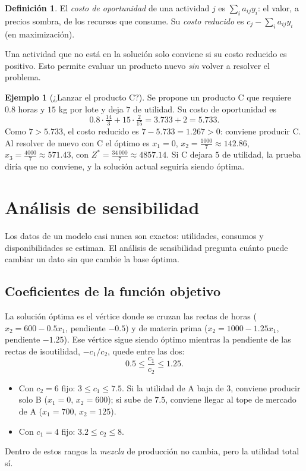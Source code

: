 \documentclass[a4paper,11pt]{article}
\theoremstyle{plain}
\theoremstyle{definition}
\newtheorem{definicion}[teorema]{Definición}
\newtheorem{ejemplo}[teorema]{Ejemplo}
\newcommand{\fr}[2]{\tfrac{#1}{#2}}
\begin{document}
\begin{definicion}
El \emph{costo de oportunidad} de una actividad $j$ es $\sum_i a_{ij}y_i$: el valor, a precios sombra, de los
recursos que consume. Su \emph{costo reducido} es $c_j-\sum_i a_{ij}y_i$ (en maximización).
\end{definicion}

Una actividad que no está en la solución solo conviene si su costo reducido es positivo. Esto permite
evaluar un producto nuevo \emph{sin} volver a resolver el problema.

\begin{ejemplo}[¿Lanzar el producto C?]
Se propone un producto C que requiere $0.8$ horas y $15$ kg por lote y deja $7$ de utilidad. Su costo de
oportunidad es
\[
0.8\cdot\fr{14}{3}+15\cdot\fr{2}{15}=3.733+2=5.733.
\]
Como $7>5.733$, el costo reducido es $7-5.733=1.267>0$: conviene producir C. Al resolver de nuevo con C el
óptimo es $x_1=0$, $x_2=\fr{1000}{7}\approx142.86$, $x_3=\fr{4000}{7}\approx571.43$, con
$Z^*=\fr{34\,000}{7}\approx4857.14$. Si C dejara $5$ de utilidad, la prueba diría que no conviene, y la
solución actual seguiría siendo óptima.
\end{ejemplo}

\section{Análisis de sensibilidad}

Los datos de un modelo casi nunca son exactos: utilidades, consumos y disponibilidades se estiman. El
análisis de sensibilidad pregunta cuánto puede cambiar un dato sin que cambie la base óptima.

\subsection{Coeficientes de la función objetivo}
La solución óptima es el vértice donde se cruzan las rectas de horas ($x_2=600-0.5x_1$, pendiente $-0.5$) y
de materia prima ($x_2=1000-1.25x_1$, pendiente $-1.25$). Ese vértice sigue siendo óptimo mientras la
pendiente de las rectas de isoutilidad, $-c_1/c_2$, quede entre las dos:
\[
0.5\le\frac{c_1}{c_2}\le1.25.
\]
\begin{itemize}
\item Con $c_2=6$ fijo: $3\le c_1\le7.5$. Si la utilidad de A baja de $3$, conviene producir solo B
($x_1=0$, $x_2=600$); si sube de $7.5$, conviene llegar al tope de mercado de A ($x_1=700$, $x_2=125$).
\item Con $c_1=4$ fijo: $3.2\le c_2\le8$.
\end{itemize}
Dentro de estos rangos la \emph{mezcla} de producción no cambia, pero la utilidad total sí.
\end{document}
